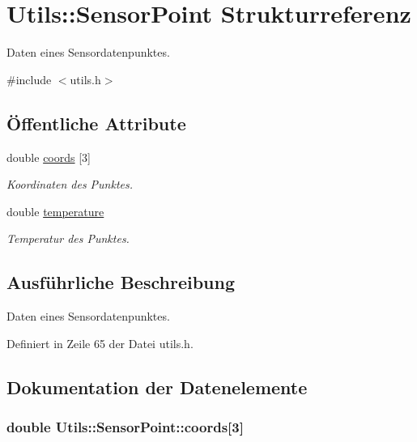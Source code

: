 \hypertarget{structUtils_1_1SensorPoint}{\section{Utils\-:\-:Sensor\-Point Strukturreferenz}
\label{structUtils_1_1SensorPoint}
}


Daten eines Sensordatenpunktes.  




{\ttfamily \#include $<$utils.\-h$>$}

\subsection*{Öffentliche Attribute}
\begin{DoxyCompactItemize}
\item 
double \hyperlink{structUtils_1_1SensorPoint_aedff5493c2f6c36e9552dc3807c8ce24}{coords} \mbox{[}3\mbox{]}
\begin{DoxyCompactList}\small\item\em Koordinaten des Punktes. \end{DoxyCompactList}\item 
double \hyperlink{structUtils_1_1SensorPoint_a764d6572f865138b36cb46c910001e9a}{temperature}
\begin{DoxyCompactList}\small\item\em Temperatur des Punktes. \end{DoxyCompactList}\end{DoxyCompactItemize}


\subsection{Ausführliche Beschreibung}
Daten eines Sensordatenpunktes. 

Definiert in Zeile 65 der Datei utils.\-h.



\subsection{Dokumentation der Datenelemente}
\hypertarget{structUtils_1_1SensorPoint_aedff5493c2f6c36e9552dc3807c8ce24}{
\subsubsection[{coords}]{\setlength{\rightskip}{0pt plus 5cm}double Utils\-::\-Sensor\-Point\-::coords\mbox{[}3\mbox{]}}}\label{structUtils_1_1SensorPoint_aedff5493c2f6c36e9552dc3807c8ce24}


